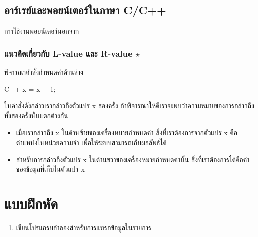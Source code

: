 \subsection{อาร์เรย์{\wbr}และ{\wbr}พอยน์เตอร์{\wbr}ใน{\wbr}ภาษา C/C++}
\label{sect:array-array-pointer-c}

การ{\wbr}ใช้{\wbr}งาน{\wbr}พอยน์เตอร์{\wbr}นอกจาก{\wbr}


\subsubsection{แนว{\wbr}คิด{\wbr}เกี่ยวกับ L-value และ R-value $\star$}
\label{sect:array-lval-rval}

พิจารณา{\wbr}คำสั่ง{\wbr}กำหนด{\wbr}ค่า{\wbr}ด้าน{\wbr}ล่าง{\wbr}

\latintext
\begin{codelist}{C++}{}
x = x + 1;
\end{codelist}
\thaitext

ใน{\wbr}คำสั่ง{\wbr}ดังกล่าว{\wbr}เรา{\wbr}กล่าว{\wbr}ถึง{\wbr}ตัวแปร {\ct x} สอง{\wbr}ครั้ง{\wbr}
ถ้า{\wbr}พิจารณา{\wbr}ให้{\wbr}ดี{\wbr}เรา{\wbr}จะ{\wbr}พบ{\wbr}ว่าความ{\wbr}หมาย{\wbr}ของ{\wbr}การ{\wbr}กล่าว{\wbr}ถึง{\wbr}ทั้ง{\wbr}สอง{\wbr}ครั้งนั้น{\wbr}แตกต่าง{\wbr}กัน{\wbr}

\begin{itemize}
\item เมื่อ{\wbr}เรา{\wbr}กล่าว{\wbr}ถึง {\ct x} ใน{\wbr}ด้าน{\wbr}ซ้าย{\wbr}ของ{\wbr}เครื่องหมาย{\wbr}กำหนด{\wbr}ค่า{\wbr}
  สิ่ง{\wbr}ที่{\wbr}เรา{\wbr}ต้องการ{\wbr}จาก{\wbr}ตัวแปร {\ct x} คือ{\wbr}ตำแหน่ง{\wbr}ใน{\wbr}หน่วยความจำ{\wbr}
  เพื่อให้{\wbr}ระบบ{\wbr}สามารถ{\wbr}เก็บ{\wbr}ผลลัพธ์{\wbr}ได้{\wbr}
\item สำหรับ{\wbr}การ{\wbr}กล่าว{\wbr}ถึง{\wbr}ตัวแปร {\ct x} ใน{\wbr}ด้าน{\wbr}ขวา{\wbr}ของ{\wbr}เครื่องหมาย{\wbr}กำหนด{\wbr}ค่า{\wbr}นั้น{\wbr}
  สิ่ง{\wbr}ที่{\wbr}เรา{\wbr}ต้องการ{\wbr}ได้{\wbr}คือ{\wbr}ค่า{\wbr}ของ{\wbr}ข้อมูล{\wbr}ที่{\wbr}เก็บ{\wbr}ใน{\wbr}ตัวแปร {\ct x}
\end{itemize}

\section{แบบฝึกหัด}

\begin{enumerate}
\item เขียน{\wbr}โปรแกรม{\wbr}ลำ{\wbr}ลอง{\wbr}สำหรับ{\wbr}การ{\wbr}แทรก{\wbr}ข้อมูล{\wbr}ใน{\wbr}รายการ{\wbr}
\end{enumerate}
